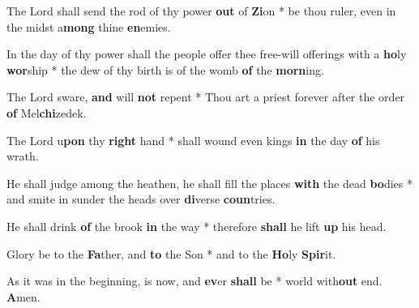 \begin{multicols}{2}
	The Lord shall send the rod of thy power \textbf{out} of \textbf{Zi}on * be thou ruler, even in the midst a\textbf{mong} thine \textbf{en}emies.
	
	In the day of thy power shall the people offer thee free-will offerings with a \textbf{ho}ly \textbf{wor}ship * the dew of thy birth is of the womb \textbf{of} the \textbf{morn}ing.
	
	The Lord sware, \textbf{and} will \textbf{not} repent * Thou art a priest forever after the order \textbf{of} Mel\textbf{chi}zedek.
	
	The Lord u\textbf{pon} thy \textbf{right} hand * shall wound even kings \textbf{in} the day \textbf{of} his wrath.
	
	He shall judge among the heathen, he shall fill the places \textbf{with} the dead \textbf{bo}dies * and smite in sunder the heads over \textbf{di}verse \textbf{coun}tries.
	
	He shall drink \textbf{of} the brook \textbf{in} the way * therefore \textbf{shall} he lift \textbf{up} his head.
	
	Glory be to the \textbf{Fa}ther, and \textbf{to} the Son * and to the \textbf{Ho}ly \textbf{Spir}it.
	
	As it was in the beginning, is now, and \textbf{ev}er \textbf{shall} be * world with\textbf{out} end. \textbf{A}men.
\end{multicols}